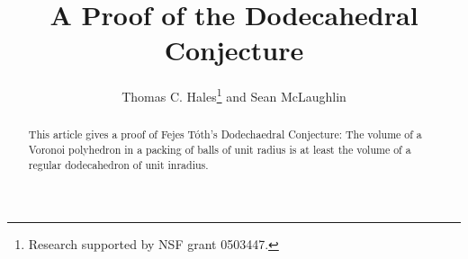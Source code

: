 \documentclass{llncs}
\begin{document}
\raggedbottom

\title{A Proof of the Dodecahedral Conjecture}
\author{Thomas C. Hales\thanks{Research supported by NSF grant 0503447.} and Sean McLaughlin}
\maketitle

\begin{abstract}  
This article gives a proof of Fejes T\'oth's Dodechaedral Conjecture: The volume of a Voronoi polyhedron in a packing of balls of unit radius is at least the volume of a regular dodecahedron of unit inradius.
\end{abstract}




\end{document}
